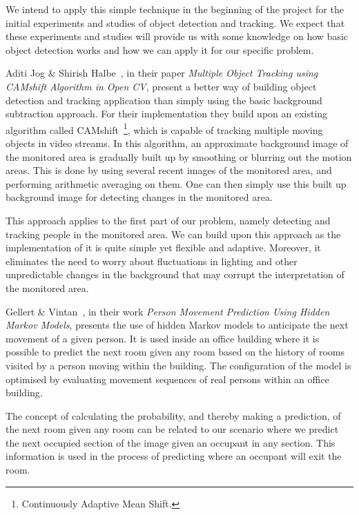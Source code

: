 We intend to apply this simple technique in the beginning of the project for the initial experiments and studies of object detection and tracking. We expect that these experiments and studies will provide us with some knowledge on how basic object detection works and how we can apply it for our specific problem.

Aditi Jog \& Shirish Halbe~\cite{jog_halbe}, in their paper \emph{Multiple Object Tracking using CAMshift Algorithm in Open CV}, present a better way of building object detection and tracking application than simply using the basic background subtraction approach. For their implementation they build upon an existing algorithm called CAMshift~\footnote{Continuously Adaptive Mean Shift.}, which is capable of tracking multiple moving objects in video streams. In this algorithm, an approximate background image of the monitored area is gradually built up by smoothing or blurring out the motion areas. This is done by using several recent images of the monitored area, and performing arithmetic averaging on them. One can then simply use this built up background image for detecting changes in the monitored area.

This approach applies to the first part of our problem, namely detecting and tracking people in the monitored area. We can build upon this approach as the implementation of it is quite simple yet flexible and adaptive. Moreover, it eliminates the need to worry about fluctuations in lighting and other unpredictable changes in the background that may corrupt the interpretation of the monitored area.

Gellert \& Vintan~\cite{gellert}, in their work \emph{Person Movement Prediction Using Hidden Markov Models}, presents the use of hidden Markov models to anticipate the next movement of a given person. It is used inside an office building where it is possible to predict the next room given any room based on the history of rooms visited by a person moving within the building. The configuration of the model is optimised by evaluating movement sequences of real persons within an office building.

The concept of calculating the probability, and thereby making a prediction, of the next room given any room can be related to our scenario where we predict the next occupied section of the image given an occupant in any section. This information is used in the process of predicting where an occupant will exit the room.

